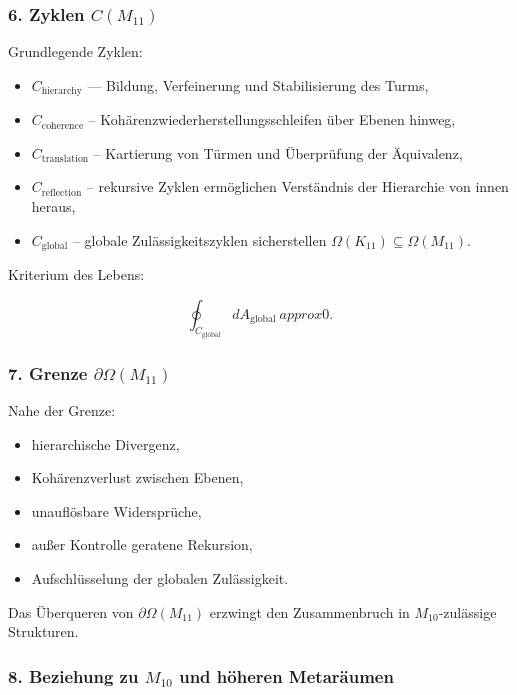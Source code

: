 \subsubsection*{6. Zyklen $C(M_{11})$}

Grundlegende Zyklen:

\begin{itemize}
    \item $C_{\mathrm{hierarchy}}$ — Bildung, Verfeinerung und Stabilisierung des Turms,
    \item $C_{\mathrm{coherence}}$ – Kohärenzwiederherstellungsschleifen über Ebenen hinweg,
    \item $C_{\mathrm{translation}}$ – Kartierung von Türmen und Überprüfung der Äquivalenz,
    \item $C_{\mathrm{reflection}}$ – rekursive Zyklen ermöglichen
          Verständnis der Hierarchie von innen heraus,
    \item $C_{\mathrm{global}}$ – globale Zulässigkeitszyklen sicherstellen
          $\Omega(K_{11})\subseteq\Omega(M_{11})$.
\end{itemize}

Kriterium des Lebens:

\[
\oint_{C_{\mathrm{global}}} dA_{\mathrm{global}} \ approx 0.
\]

\subsubsection*{7. Grenze $\partial\Omega(M_{11})$}

Nahe der Grenze:

\begin{itemize}
    \item hierarchische Divergenz,
    \item Kohärenzverlust zwischen Ebenen,
    \item unauflösbare Widersprüche,
    \item außer Kontrolle geratene Rekursion,
    \item Aufschlüsselung der globalen Zulässigkeit.
\end{itemize}

Das Überqueren von $\partial\Omega(M_{11})$ erzwingt den Zusammenbruch in $M_{10}$-zulässige Strukturen.

\subsubsection*{8. Beziehung zu $M_{10}$ und höheren Metaräumen}

